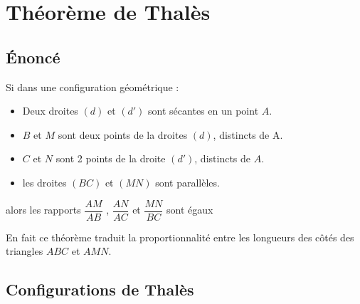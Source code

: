 \section{Théorème de Thalès}
    \subsection{Énoncé}
        \begin{theoreme}[\admis]
            Si dans une configuration géométrique :
            \begin{itemize}
                \item Deux droites $(d)$ et $(d')$ sont sécantes en un point $A$.
                \item $B$ et $M$ sont deux points de la droites $(d)$, distincts de A.
                \item $C$ et $N$ sont 2 points de la droite $(d')$, distincts de $A$.
                \item les droites $(BC)$ et $(MN)$ sont parallèles.       
            \end{itemize}
            \medskip
            alors les rapports $\dfrac{AM}{AB}$ , $\dfrac{AN}{AC}$ et $\dfrac{MN}{BC}$ sont égaux
        \end{theoreme}

        \begin{remarque}
            En fait ce théorème traduit la proportionnalité entre les longueurs des côtés des triangles $ABC$ et $AMN$.
        \end{remarque}
    
    \subsection{Configurations de Thalès}

